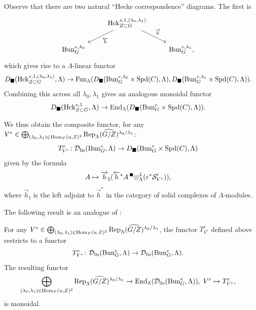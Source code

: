 Observe that there are two natural ``Hecke correspondence'' diagrams. The first is
\[
\begin{tikzcd}
  &  \Hck_{Z \subset G}^{e,1,(\lambda_{0},\lambda_{1})} \arrow["\overleftarrow{h}"]{ld} \arrow["\overrightarrow{h}"]{rd} & \\
  \Bun_{G}^{e,\lambda_{0}} & & \Bun_{G}^{e,\lambda_{1}},
\end{tikzcd}
\]
which gives rise to a $\Lambda$-linear functor
\begin{equation*}
    D_{\blacksquare}(\mathrm{Hck}_{Z \subset G}^{e,1,(\lambda_{0},\lambda_{1})},\Lambda) \to \textnormal{Fun}_{\Lambda}(D_{\blacksquare}(\mathrm{Bun}_{G}^{e,\lambda_{0}} \times \mathrm{Spd}(C),\Lambda), D_{\blacksquare}(\mathrm{Bun}_{G}^{e,\lambda_{1}} \times \mathrm{Spd}(C),\Lambda)).
\end{equation*}
Combining this across all $\lambda_{0},\lambda_{1}$ gives an analogous monoidal functor 
\begin{equation}\label{eq:monoidal2}
D_{\blacksquare}(\mathrm{Hck}_{Z \subset G}^{e,1},\Lambda) \to \textnormal{End}_{\Lambda}(D_{\blacksquare}(\mathrm{Bun}_{G}^{e} \times \mathrm{Spd}(C),\Lambda)).
\end{equation}

We thus obtain the composite functor, for any $V^{e} \in   \bigoplus_{(\lambda_{0}, \lambda_{1}) \in \mathrm{Hom}_{F}(u, Z)^{2}} \textnormal{Rep}_{\Lambda}(\widehat{G/Z})^{\lambda_{0}/\lambda_{1}}$:
\begin{equation*}
T^{e}_{V^{e}} \colon \mathcal{D}_{\textnormal{lis}}(\mathrm{Bun}_{G}^{e},\Lambda) \to D_{\blacksquare}(\mathrm{Bun}_{G}^{e} \times \mathrm{Spd}(C), \Lambda)
\end{equation*}
given by the formula
\begin{equation*}
    A \mapsto \overrightarrow{h}_{\natural}(\overleftarrow{h}^{*}A \prescript{\mathsmaller{\blacksquare}}{}\otimes_{\Lambda}^{L} (\varepsilon^{*}\mathcal{S}_{V^{e}}')),
\end{equation*}
where $\overrightarrow{h}_{\natural}$ is the left adjoint to $\overrightarrow{h}^{*}$ in the category of solid complexes of $\Lambda$-modules.


The following result is an analogue of \cite[Proposition IX.2.1]{Geometrization}:
\begin{prop}
    For any $V^{e} \in  \bigoplus_{(\lambda_{0}, \lambda_{1}) \in \mathrm{Hom}_{F}(u, Z)^{2}} \textnormal{Rep}_{\Lambda}(\widehat{G/Z})^{\lambda_{0}/\lambda_{1}}$, the functor $T^{e}_{V^{e}}$ defined above restricts to a functor 
    \begin{equation*}
T^{e}_{V^{e}} \colon \mathcal{D}_{\textnormal{lis}}(\mathrm{Bun}_{G}^{e}, \Lambda) \to \mathcal{D}_{\textnormal{lis}}(\mathrm{Bun}_{G}^{e}, \Lambda).
    \end{equation*}
    The resulting functor
    \begin{equation*}
         \bigoplus_{(\lambda_{0}, \lambda_{1}) \in \mathrm{Hom}_{F}(u, Z)^{2}} \textnormal{Rep}_{\Lambda}(\widehat{G/Z})^{\lambda_{0}/\lambda_{1}}  \to \textnormal{End}_{\Lambda}(\mathcal{D}_{\textnormal{lis}}(\mathrm{Bun}_{G}^{e},\Lambda)), \hspace{1mm} V^{e} \mapsto T^{e}_{V^{e}},
    \end{equation*}
    is monoidal.
\end{prop}

